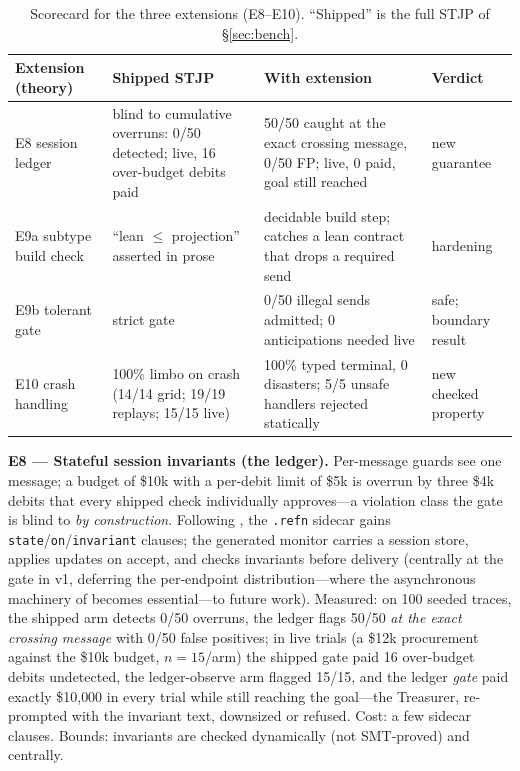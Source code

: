 \documentclass{article}
\newcommand{\stjp}{\textsc{STJP}}
\begin{document}
\begin{table}[t]
\centering\small
\caption{Scorecard for the three extensions (E8--E10). ``Shipped'' is the full \stjp{} of \S\ref{sec:bench}.}
\label{tab:ext}
\begin{tabular}{@{}p{3.4cm}p{4.1cm}p{4.6cm}l@{}}
\toprule
\textbf{Extension (theory)} & \textbf{Shipped \stjp{}} & \textbf{With extension} & \textbf{Verdict} \\
\midrule
E8 session ledger \citep{chen12} & blind to cumulative overruns: 0/50 detected; live, 16 over-budget debits paid & 50/50 caught at the exact crossing message, 0/50 FP; live, 0 paid, goal still reached & new guarantee \\
E9a subtype build check \citep{chen17} & ``lean $\leq$ projection'' asserted in prose & decidable build step; catches a lean contract that drops a required send & hardening \\
E9b tolerant gate \citep{chen17,chen24} & strict gate & 0/50 illegal sends admitted; 0 anticipations needed live & safe; boundary result \\
E10 crash handling \citep{viering18} & 100\% limbo on crash (14/14 grid; 19/19 replays; 15/15 live) & 100\% typed terminal, 0 disasters; 5/5 unsafe handlers rejected statically & new checked property \\
\bottomrule
\end{tabular}
\end{table}

\textbf{E8 --- Stateful session invariants (the ledger).} Per-message guards see one message; a budget of \$10k with a per-debit limit of \$5k is overrun by three \$4k debits that every shipped check individually approves---a violation class the gate is blind to \emph{by construction}. Following \citet{chen12}, the \texttt{.refn} sidecar gains \texttt{state}/\texttt{on}/\texttt{invariant} clauses; the generated monitor carries a session store, applies updates on accept, and checks invariants before delivery (centrally at the gate in v1, deferring the per-endpoint distribution---where the asynchronous machinery of \citet{chen12} becomes essential---to future work). Measured: on 100 seeded traces, the shipped arm detects 0/50 overruns, the ledger flags 50/50 \emph{at the exact crossing message} with 0/50 false positives; in live trials (a \$12k procurement against the \$10k budget, $n{=}15$/arm) the shipped gate paid 16 over-budget debits undetected, the ledger-observe arm flagged 15/15, and the ledger \emph{gate} paid exactly \$10{,}000 in every trial while still reaching the goal---the Treasurer, re-prompted with the invariant text, downsized or refused. Cost: a few sidecar clauses. Bounds: invariants are checked dynamically (not SMT-proved) and centrally.
\end{document}
